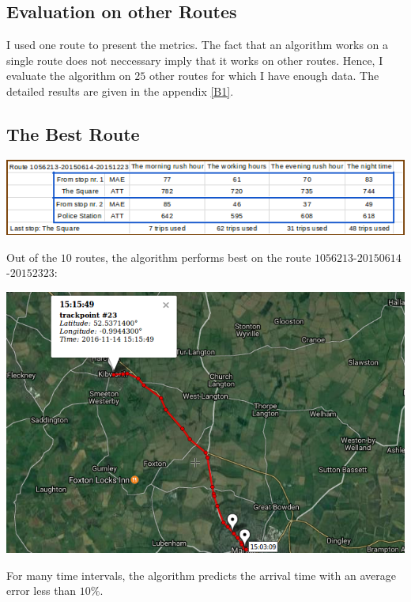 \documentclass[12pt,a4paper,oneside,openright]{report}
\begin{document}
\subsection{Evaluation on other Routes}

I used one route to present the metrics. The fact that an algorithm works on a single route
does not neccessary imply that it works on other routes. Hence, I evaluate the algorithm on
$25$ other routes for which I have enough data. The
detailed results are given in the appendix \ref{B1}. \\

\subsection*{The Best Route}

\includegraphics[width=\textwidth]{figs/table_of_1056213.png}

Out of the $10$ routes, the algorithm performs best on the route
$1056213$-$20150614$-$20152323$:

\includegraphics[scale=0.65]{figs/best_route.png}

For many time intervals, the algorithm predicts the arrival time with an average error
less than $10\%$. \\
\end{document}
